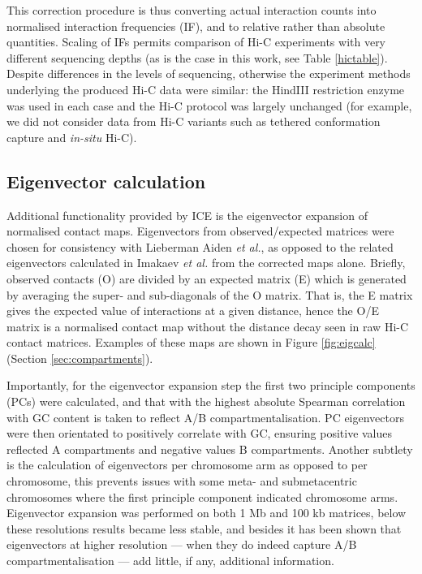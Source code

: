 \documentclass[a4paper,11pt,oneside]{book}
\begin{document}
This correction procedure is thus converting actual interaction counts into normalised interaction frequencies (IF), and to relative rather than absolute quantities. Scaling of IFs permits comparison of Hi-C experiments with very different sequencing depths (as is the case in this work, see Table \ref{hictable}). Despite differences in the levels of sequencing, otherwise the experiment methods underlying the produced Hi-C data were similar: the HindIII restriction enzyme was used in each case and the Hi-C protocol was largely unchanged (for example, we did not consider data from Hi-C variants such as tethered conformation capture\cite{Kalhor2012} and \emph{in-situ} Hi-C\cite{Rao2014}).

\subsection{Eigenvector calculation}\label{sec:eigs}
Additional functionality provided by ICE is the eigenvector expansion of normalised contact maps. Eigenvectors from observed/expected matrices were chosen for consistency with Lieberman Aiden \emph{et al.},\cite{Lieberman2009} as opposed to the related eigenvectors calculated in Imakaev \emph{et al.}\cite{Imakaev2012} from the corrected maps alone. Briefly, observed contacts (O) are divided by an expected matrix (E) which is generated by averaging the super- and sub-diagonals of the O matrix. That is, the E matrix gives the expected value of interactions at a given distance, hence the O/E matrix is a normalised contact map without the distance decay seen in raw Hi-C contact matrices. Examples of these maps are shown in Figure \ref{fig:eigcalc} (Section \ref{sec:compartments}).

Importantly, for the eigenvector expansion step the first two principle components (PCs) were calculated, and that with the highest absolute Spearman correlation with GC content is taken to reflect A/B compartmentalisation. PC eigenvectors were then orientated to positively correlate with GC, ensuring positive values reflected A compartments and negative values B compartments. Another subtlety is the calculation of eigenvectors per chromosome arm as opposed to per chromosome, this prevents issues with some meta- and submetacentric chromosomes where the first principle component indicated chromosome arms.\cite{Lieberman2009, Imakaev2012} Eigenvector expansion was performed on both 1 Mb and 100 kb matrices, below these resolutions results became less stable, and besides it has been shown that eigenvectors at higher resolution --- when they do indeed capture A/B compartmentalisation --- add little, if any, additional information.\cite{Fortin2015a}
\end{document}
